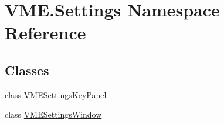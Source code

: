 \hypertarget{namespace_v_m_e_1_1_settings}{}\section{V\+M\+E.\+Settings Namespace Reference}
\label{namespace_v_m_e_1_1_settings}
\subsection*{Classes}
\begin{DoxyCompactItemize}
\item 
class \hyperlink{class_v_m_e_1_1_settings_1_1_v_m_e_settings_key_panel}{V\+M\+E\+Settings\+Key\+Panel}
\item 
class \hyperlink{class_v_m_e_1_1_settings_1_1_v_m_e_settings_window}{V\+M\+E\+Settings\+Window}
\end{DoxyCompactItemize}
